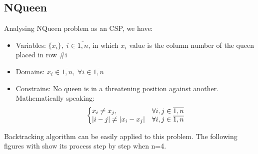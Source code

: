 \documentclass[a4paper, 11pt]{article}
\begin{document}
\subsection{NQueen}
Analysing NQueen problem as an CSP, we have:
\begin{itemize}
\item Variables: $\{x_i\},\; i \in \overline{1,n}$, in which $x_i$ value is the column number of the queen placed in row \#i
\item Domains: $x_i \in \overline{1,n}, \; \forall i \in \overline{1,n}$
\item Constrains: No queen is in a threatening position against another. Mathematically speaking: 
  \[ \left \{
    \begin{array}{@{} l c @{}}
      x_i \neq x_j, & \forall i,j \in \overline{1,n}  \\
      |i-j| \neq |x_i-x_j| & \forall i,j \in \overline{1,n}
    \end{array} \right.
  \]
\end{itemize}
Backtracking algorithm can be easily applied to this problem. The following figures with show its process step by step when n=4. \\
\end{document}
